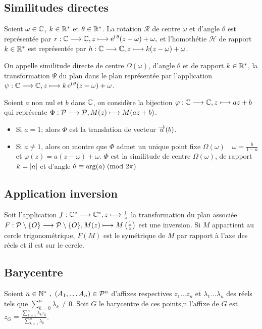 \subsection{Similitudes directes}
\label{subsec:simdirecte}
Soient \(\omega \in \mathbb{C}\), \(k\in \mathbb{R}^*\) et \(\theta \in \mathbb{R}^*\). La rotation 
\(\mathcal{R}\) de centre \(\omega\) et d'angle \(\theta\) est représentée par 
\(r:\mathbb{C} \longrightarrow \mathbb{C}, z \longmapsto \operatorname{e}^{\operatorname{i} \theta}(z-\omega)+\omega,\) et l'homothétie 
\(\mathcal{H}\) de rapport \(k \in \mathbb{R}^*\) est représentée par 
\(h:\mathbb{C} \longrightarrow \mathbb{C}, z \longmapsto k(z-\omega)+\omega\).
\begin{defdef}
    On appelle similitude directe de centre \(\Omega(\omega)\), d'angle 
    \(\theta\) et de rapport \(k \in \mathbb{R}^*\), la transformation \(\Psi\) du plan 
    dans le plan représentée par l'application 
    \(\psi:\mathbb{C} \longrightarrow \mathbb{C}, z \longmapsto k \operatorname{e}^{\operatorname{i} \theta}(z-\omega)+\omega\).
\end{defdef}
Soient \(a\) non nul et \(b\) dans \(\mathbb{C}\), on considère la bijection 
\(\varphi:\mathbb{C} \longrightarrow \mathbb{C}, z \longmapsto az+b\) qui représente 
\(\Phi:\mathcal{P} \longrightarrow \mathcal{P}, M(z) \longmapsto M(az+b)\).
\begin{itemize}
    \item Si \(a=1\); alors  \(\Phi\) est la translation de vecteur \(\overrightarrow{u}(b)\).
    \item Si \(a \neq 1\), alors on montre que \(\Phi\) admet un unique point 
        fixe \(\Omega(\omega) \quad \omega = \frac{b}{1-a}\) et 
        \(\varphi(z)=a(z-\omega)+\omega\).
        \(\Phi\) est la similitude de centre \(\Omega(\omega)\), de rapport 
        \(k=\left\lvert a\right\rvert\) et d'angle \(\theta \equiv \arg(a)\!\pmod {2\pi}\)
\end{itemize}
\subsection{Application inversion}
\label{subsec:appinverse}
Soit l'application \(f:\mathbb{C}^* \longrightarrow \mathbb{C}^*, z \longmapsto \frac{1}{z}\) la 
transformation du plan associée \(F:\mathcal{P} \setminus\{O\} \longrightarrow \mathcal{P} 
\setminus\{O\}, M(z) \longmapsto M \left( \frac{1}{z} \right)\) est une inversion. Si 
\(M\) appartient au cercle trigonométrique, \(F(M)\) est le symétrique de \(M\) 
par rapport à l'axe des réels et il est sur le cercle.
\subsection{Barycentre}
\label{subsec:complexebarycentre}
Soient \(n \in \mathbb{N}^{*} \ , \ (A_1, \ldots A_n) \in \mathcal{P}^n\)  d'affixes respectives 
\(z_1 \ldots z_n\) et \(\lambda_1 \ldots \lambda_n\) des réels tels que 
\(\sum_{k=0}^{n} \lambda_k \neq 0\). Soit \(G\) le barycentre de ces points,n 
l'affixe de \(G\) est \(z_G=\frac{\sum_{k=1}^{n}\lambda_k 
z_k}{\sum_{k=1}^{n}\lambda_k}\).
